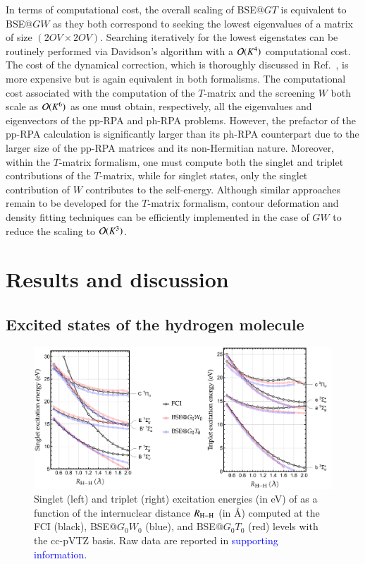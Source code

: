 \documentclass[aip,jcp,reprint,noshowkeys,superscriptaddress]{revtex4-1}
\newcommand{\SupInf}{\textcolor{blue}{supporting information}}
\newcommand{\Norb}{K}
\newcommand{\Nocc}{O}
\newcommand{\Nvir}{V}
\begin{document}
In terms of computational cost, the overall scaling of BSE@$GT$ is equivalent to BSE@$GW$ as they both correspond to seeking the lowest eigenvalues of a matrix of size $(2\Nocc\Nvir \times 2\Nocc\Nvir)$. 
Searching iteratively for the lowest eigenstates can be routinely performed via Davidson's algorithm with a $\order*{\Norb^4}$ computational cost. \cite{Davidson_1975}
The cost of the dynamical correction, which is thoroughly discussed in Ref.~, is more expensive but is again equivalent in both formalisms.
The computational cost associated with the computation of the $T$-matrix and the screening $W$ both scale as $\order*{\Norb^6}$ as one must obtain, respectively, all the eigenvalues and eigenvectors of the pp-RPA and ph-RPA problems.
However, the prefactor of the pp-RPA calculation is significantly larger than its ph-RPA counterpart due to the larger size of the pp-RPA matrices and its non-Hermitian nature. \cite{Peng_2013,Scuseria_2013,Yang_2013,Yang_2013b,Yang_2014a,Zhang_2015,Zhang_2016}
Moreover, within the $T$-matrix formalism, one must compute both the singlet and triplet contributions of the $T$-matrix, while for singlet states, only the singlet contribution of $W$ contributes to the self-energy.
Although similar approaches remain to be developed for the $T$-matrix formalism, contour deformation and density fitting techniques can be efficiently implemented in the case of $GW$ to reduce the scaling to $\order*{\Norb^3}$. \cite{Duchemin_2019,Duchemin_2020,Duchemin_2021}

\section{Results and discussion}
\label{sec:res}

\subsection{Excited states of the hydrogen molecule}
\label{sec:h2}

\begin{figure}
	\includegraphics[width=\textwidth]{H2}
	\caption{Singlet (left) and triplet (right) excitation energies (in \si{\eV}) of  as a function of the internuclear distance $R_{\ce{H-H}}$ (in \si{\angstrom}) computed at the FCI (black), BSE@$G_0W_0$ (blue), and BSE@$G_0T_0$ (red) levels with the cc-pVTZ basis.
	Raw data are reported in {\SupInf}.}
	\label{fig:H2}
\end{figure}
\end{document}
